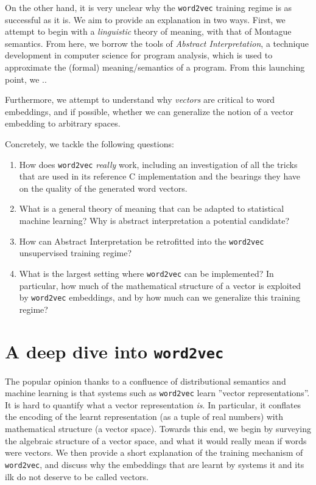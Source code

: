 \documentclass[11pt]{book}
\newcommand{\wtov}{\texttt{word2vec }}
\begin{document}
On the other hand, it is very unclear why the \texttt{word2vec} training regime
is as successful as it is. We aim to provide an explanation in two ways. First, we attempt to begin with a \emph{linguistic} theory of meaning, with that of Montague semantics. From here, we borrow the tools of \emph{Abstract Interpretation}, a technique development in computer science for program analysis, which is used to approximate the (formal) meaning/semantics of a program. From this launching point, we ..

Furthermore, we attempt to understand why \emph{vectors} are critical to word embeddings, and if possible, whether we can generalize the notion of a vector embedding to arbitrary spaces.

Concretely, we tackle the following questions:

\begin{enumerate}
	\item How does \texttt{word2vec} \emph{really} work, including an investigation of all the tricks that are used in its reference C implementation and the bearings they have on the quality of the generated word vectors.
	\item What is a general theory of meaning that can be adapted to statistical machine learning? Why is abstract interpretation a potential candidate?
	\item How can Abstract Interpretation be retrofitted into the  \texttt{word2vec} unsupervised training regime?
	\item What is the largest setting where \texttt{word2vec} can be implemented? In particular, how much of the mathematical structure of a vector is exploited by \texttt{word2vec} embeddings, and by how much can we generalize this training regime?
\end{enumerate}



\chapter{A deep dive into \wtov }

The popular opinion thanks to a confluence of distributional semantics
and machine learning is that systems such as \texttt{word2vec} learn
''vector representations''. It is hard to quantify what a vector representation \emph{is}.
In particular, it conflates the encoding of the learnt representation
(as a tuple of real numbers) with mathematical structure
(a vector space). Towards this end, we begin by surveying the algebraic structure of a vector
space, and what it would really mean if words were vectors. We then provide
a short explanation of the training mechanism of \texttt{word2vec}, and
discuss why the embeddings that are learnt by systems it and its ilk do not
deserve to be called vectors. 
\end{document}
